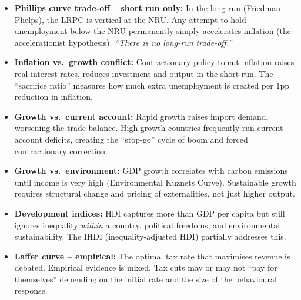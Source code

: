 \documentclass[11pt, a4paper, twoside]{book}
\begin{document}
\begin{tcolorbox}[enhanced,colback=white,colframe=GuideRule,arc=1.5pt,boxrule=0.4pt,title={\bfseries\color{CurveNavy}Evaluation: Phillips Curve, Conflicts and Policy Effectiveness},fonttitle=\small]
\small\RaggedRight
\begin{itemize}[itemsep=2pt,topsep=2pt]
  \item \textbf{Phillips curve trade-off -- short run only:} In the long run (Friedman--Phelps), the LRPC is vertical at the NRU. Any attempt to hold unemployment below the NRU permanently simply accelerates inflation (the accelerationist hypothesis). \textit{``There is no long-run trade-off.''}
  \item \textbf{Inflation vs.\ growth conflict:} Contractionary policy to cut inflation raises real interest rates, reduces investment and output in the short run. The ``sacrifice ratio'' measures how much extra unemployment is created per 1pp reduction in inflation.
  \item \textbf{Growth vs.\ current account:} Rapid growth raises import demand, worsening the trade balance. High growth countries frequently run current account deficits, creating the ``stop-go'' cycle of boom and forced contractionary correction.
  \item \textbf{Growth vs.\ environment:} GDP growth correlates with carbon emissions until income is very high (Environmental Kuznets Curve). Sustainable growth requires structural change and pricing of externalities, not just higher output.
  \item \textbf{Development indices:} HDI captures more than GDP per capita but still ignores inequality \textit{within} a country, political freedoms, and environmental sustainability. The IHDI (inequality-adjusted HDI) partially addresses this.
  \item \textbf{Laffer curve -- empirical:} The optimal tax rate that maximises revenue is debated. Empirical evidence is mixed. Tax cuts may or may not ``pay for themselves'' depending on the initial rate and the size of the behavioural response.
\end{itemize}
\end{tcolorbox}

\end{document}
